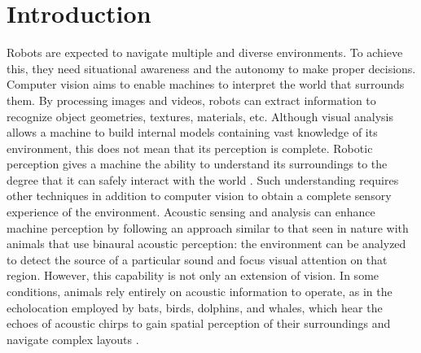 \chapter{Introduction}
\label{chapter:introduction}

Robots are expected to navigate multiple and diverse environments. To achieve this, they need situational awareness and the autonomy to make proper decisions. Computer vision aims to enable machines to interpret the world that surrounds them. By processing images and videos, robots can extract information to recognize object geometries, textures, materials, etc. Although visual analysis allows a machine to build internal models containing vast knowledge of its environment, this does not mean that its perception is complete. Robotic perception gives a machine the ability to understand its surroundings to the degree that it can safely interact with the world \cite{RobotV}. Such understanding requires other techniques in addition to computer vision to obtain a complete sensory experience of the environment. Acoustic sensing and analysis can enhance machine perception by following an approach similar to that seen in nature with animals that use binaural acoustic perception: the environment can be analyzed to detect the source of a particular sound and focus visual attention on that region. However, this capability is not only an extension of vision. In some conditions, animals rely entirely on acoustic information to operate, as in the echolocation employed by bats, birds, dolphins, and whales, which hear the echoes of acoustic chirps to gain spatial perception of their surroundings and navigate complex layouts \cite{echoloco}. 

